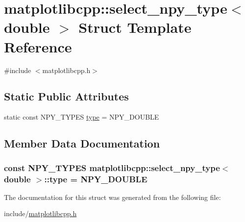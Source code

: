 \hypertarget{structmatplotlibcpp_1_1select__npy__type_3_01double_01_4}{}\section{matplotlibcpp\+:\+:select\+\_\+npy\+\_\+type$<$ double $>$ Struct Template Reference}
\label{structmatplotlibcpp_1_1select__npy__type_3_01double_01_4}


{\ttfamily \#include $<$matplotlibcpp.\+h$>$}

\subsection*{Static Public Attributes}
\begin{DoxyCompactItemize}
\item 
static const N\+P\+Y\+\_\+\+T\+Y\+P\+ES \hyperlink{structmatplotlibcpp_1_1select__npy__type_3_01double_01_4_a939edaf81fedb879c8c90ad13c98a709}{type} = N\+P\+Y\+\_\+\+D\+O\+U\+B\+LE
\end{DoxyCompactItemize}


\subsection{Member Data Documentation}
\subsubsection[{\texorpdfstring{type}{type}}]{\setlength{\rightskip}{0pt plus 5cm}const N\+P\+Y\+\_\+\+T\+Y\+P\+ES {\bf matplotlibcpp\+::select\+\_\+npy\+\_\+type}$<$ double $>$\+::type = N\+P\+Y\+\_\+\+D\+O\+U\+B\+LE\hspace{0.3cm}{\ttfamily [static]}}\hypertarget{structmatplotlibcpp_1_1select__npy__type_3_01double_01_4_a939edaf81fedb879c8c90ad13c98a709}{}\label{structmatplotlibcpp_1_1select__npy__type_3_01double_01_4_a939edaf81fedb879c8c90ad13c98a709}


The documentation for this struct was generated from the following file\+:\begin{DoxyCompactItemize}
\item 
include/\hyperlink{matplotlibcpp_8h}{matplotlibcpp.\+h}\end{DoxyCompactItemize}
